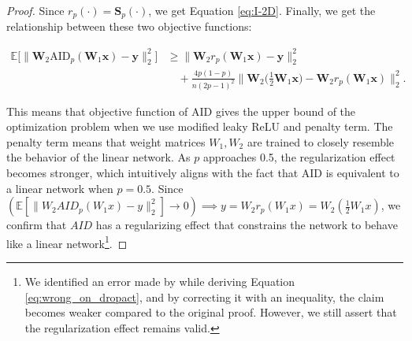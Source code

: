 \begin{proof}
    Since $r_p(\cdot) = \mathbf{S}_p(\cdot)$, we get Equation \eqref{eq:I-2D}. Finally, we get the relationship between these two objective functions:

    \begin{align*}
    \mathbb{E}\big[\|\mathbf{W}_2 \text{AID}_p(\mathbf{W}_1 \mathbf{x}) - \mathbf{y}\|_2^2 \big] 
    &\geq \|\mathbf{W}_2 r_p(\mathbf{W}_1 \mathbf{x}) - \mathbf{y}\|_2^2 \\
    &\quad + \frac{4p(1-p)}{n(2p-1)^2} \|\mathbf{W}_2 \big(\frac{1}{2}\mathbf{W}_1 \mathbf{x}\big) - \mathbf{W}_2 r_p(\mathbf{W}_1 \mathbf{x})\|_2^2.
\end{align*}


    This means that objective function of AID gives the upper bound of the optimization problem when we use modified leaky ReLU and penalty term. The penalty term means that weight matrices $W_1, W_2$ are trained to closely resemble the behavior of the linear network. As $p$ approaches 0.5, the regularization effect becomes stronger, which intuitively aligns with the fact that AID is equivalent to a linear network when $p=0.5$. Since $\left(\mathbb E[\|W_2AID_p(W_1x)-y\|_2^2] \rightarrow 0 \right) \implies y =W_2r_p(W_1x) = W_2(\frac{1}{2}W_1x)$, we confirm that $AID$ has a regularizing effect that constrains the network to behave like a linear network\footnote{We identified an error made by \citet{liang2021drop} while deriving Equation \eqref{eq:wrong_on_dropact}, and by correcting it with an inequality, the claim becomes weaker compared to the original proof. However, we still assert that the regularization effect remains valid.}.

    
    
\end{proof}

